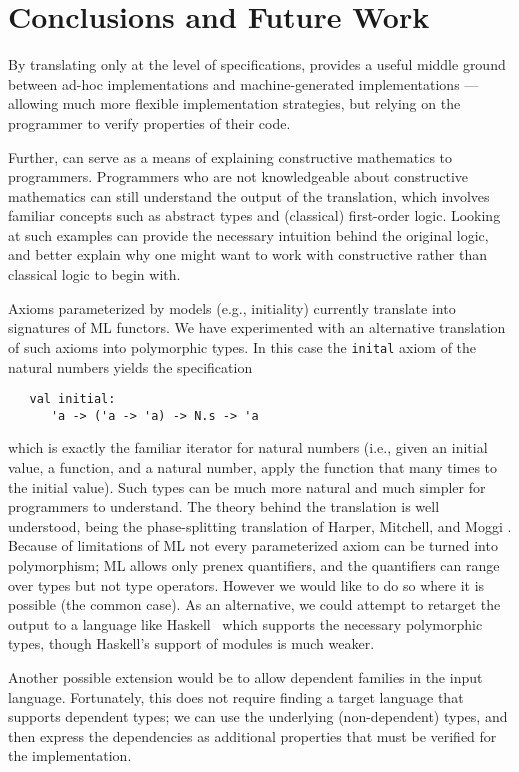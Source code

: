 \section{Conclusions and Future Work}
\label{sec:conclusion}

By translating only at the level of specifications, \RZ provides a
useful middle ground between ad-hoc implementations and
machine-generated implementations --- allowing much more flexible
implementation strategies, but relying on the programmer to
verify properties of their code.

Further, \RZ can serve as a means of explaining constructive
mathematics to programmers.  Programmers who are not knowledgeable
about constructive mathematics can still understand the output of the
translation, which involves familiar concepts such as abstract types
and (classical) first-order logic.   Looking at such examples can
provide the necessary intuition behind the original logic, and better
explain why one might want to work with constructive rather than
classical logic to begin with.

\bigskip
 
Axioms parameterized by models (e.g., initiality) currently translate
into signatures of ML functors.  We have experimented with an
alternative translation of such axioms into polymorphic types.  In
this case the \Verb|inital| axiom of the natural numbers yields
the specification
\begin{Verbatim}
   val initial: 
      'a -> ('a -> 'a) -> N.s -> 'a
\end{Verbatim}
which is exactly the familiar iterator for natural numbers (i.e.,
given an initial value, a function, and a natural number, apply the
function that many times to the initial value).  Such types can be
much more natural and much simpler for programmers to understand.  The
theory behind the translation is well understood, being the
phase-splitting translation of Harper, Mitchell, and Moggi
\cite{harper+:popl90}.  Because of limitations of ML not every
parameterized axiom can be turned into polymorphism; ML allows only
prenex quantifiers, and the quantifiers can range over types but not
type operators.  However we would like to do so where it is possible
(the common case).  As an alternative, we could attempt to retarget
the output to a language like Haskell~\cite{haskell} which supports
the necessary polymorphic types, though Haskell's support of modules
is much weaker.

Another possible extension would be to allow dependent families in the
input language. Fortunately, this does not require finding a target
language that supports dependent types; we can use the underlying
(non-dependent) types, and then express the dependencies as additional
properties that must be verified for the implementation.



